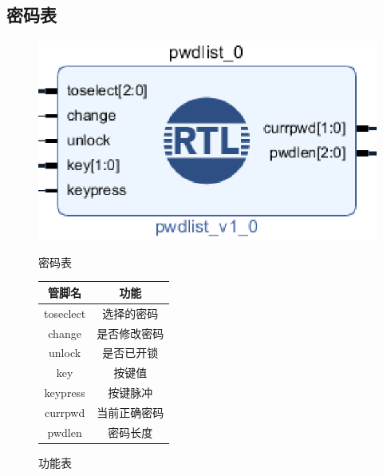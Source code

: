 \documentclass[a4paper,11pt]{ctexart}
\begin{document}
\subsection{密码表}
\begin{figure}[htb]
  \begin{minipage}[b]{0.5\textwidth}
    \centering
    \includegraphics{./images/pwdlist.eps}
    \caption{密码表}
    \label{fig:by:table}
  \end{minipage}%
  \begin{minipage}[b]{0.5\textwidth}
    \centering
    \begin{tabular}{|c|c|} \hline
      管脚名 & 功能 \\ \hline\hline
      toseclect     &   选择的密码 \\
      change        & 是否修改密码 \\
      unlock        & 是否已开锁 \\
      key           & 按键值 \\
      keypress      & 按键脉冲 \\
      currpwd       & 当前正确密码\\
      pwdlen        & 密码长度 \\ \hline
    \end{tabular}
    \caption{功能表}
    \label{table:by:fig}
  \end{minipage}
\end{figure}
\end{document}
